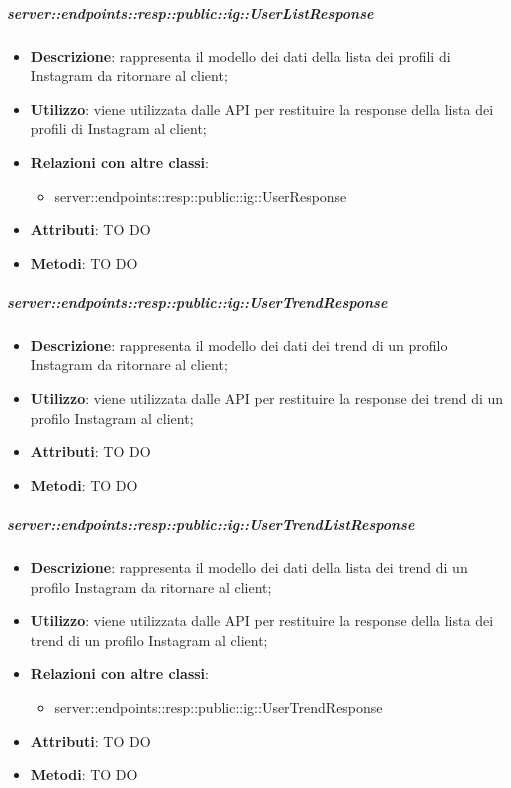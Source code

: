     \subparagraph{server::endpoints::resp::public::ig::UserListResponse} %
    \label{subp:bdsm_app_server_endpoints_resp_public_ig_userlistresponse}
    \begin{itemize}
      \item \textbf{Descrizione}: rappresenta il modello dei dati della lista dei profili di Instagram da ritornare al client;
      \item \textbf{Utilizzo}: viene utilizzata dalle API per restituire la response della lista dei profili di Instagram al client;
      \item \textbf{Relazioni con altre classi}:
        \begin{itemize}
          \item server::endpoints::resp::public::ig::UserResponse
        \end{itemize}
	  \item \textbf{Attributi}: TO DO
	  \item \textbf{Metodi}: TO DO
      \end{itemize}

    \subparagraph{server::endpoints::resp::public::ig::UserTrendResponse} %
    \label{subp:bdsm_app_server_endpoints_resp_public_ig_usertrendresponse}
    \begin{itemize}
      \item \textbf{Descrizione}: rappresenta il modello dei dati dei trend di un profilo Instagram da ritornare al client;
      \item \textbf{Utilizzo}: viene utilizzata dalle API per restituire la response dei trend di un profilo Instagram al client;
      
	  \item \textbf{Attributi}: TO DO
	  \item \textbf{Metodi}: TO DO
      \end{itemize}

    \subparagraph{server::endpoints::resp::public::ig::UserTrendListResponse} %
    \label{subp:bdsm_app_server_endpoints_resp_public_ig_usertrendlistresponse}
    \begin{itemize}
      \item \textbf{Descrizione}: rappresenta il modello dei dati della lista dei trend di un profilo Instagram da ritornare al client;
      \item \textbf{Utilizzo}: viene utilizzata dalle API per restituire la response della lista dei trend di un profilo Instagram al client;
      \item \textbf{Relazioni con altre classi}:
        \begin{itemize}
          \item server::endpoints::resp::public::ig::UserTrendResponse
        \end{itemize}
	  \item \textbf{Attributi}: TO DO
	  \item \textbf{Metodi}: TO DO
      \end{itemize}

